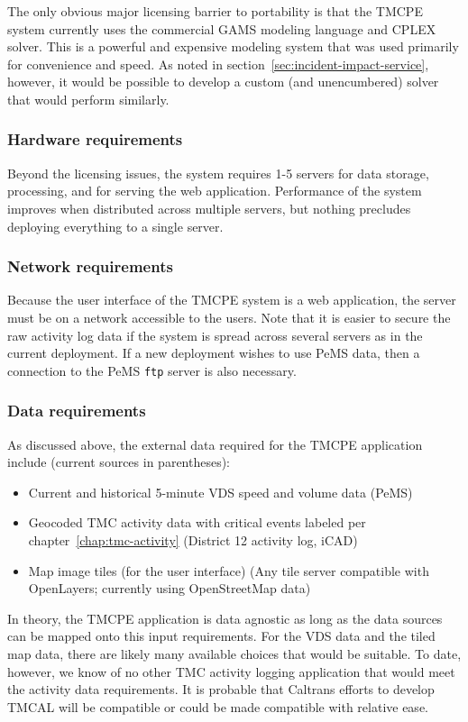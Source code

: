 \documentclass[12pt]{report}
\begin{document}
The only obvious major licensing barrier to portability is that the \ac{TMCPE}
system currently uses the commercial \ac{GAMS} modeling language and \ac{CPLEX}
solver.  This is a powerful and expensive modeling system that was used
primarily for convenience and speed.  As noted in
section~\ref{sec:incident-impact-service}, however, it would be possible to
develop a custom (and unencumbered) solver that would perform similarly.

\subsubsection{Hardware requirements}
\label{sec:portability-hardware}

Beyond the licensing issues, the system requires 1-5 servers for data storage,
processing, and for serving the web application.  Performance of the system
improves when distributed across multiple servers, but nothing precludes
deploying everything to a single server.  

\subsubsection{Network requirements}
\label{sec:portability-network}

Because the user interface of the \ac{TMCPE} system is a web application, the
server must be on a network accessible to the users.  Note that it is easier to
secure the raw activity log data if the system is spread across several servers
as in the current deployment.  If a new deployment wishes to use \ac{PeMS} data,
then a connection to the \ac{PeMS} \texttt{ftp} server is also necessary.

\subsubsection{Data requirements}
\label{sec:portability-data}

As discussed above, the external data required for the \ac{TMCPE} application
include (current sources in parentheses):
\begin{itemize}
\item Current and historical 5-minute \ac{VDS} speed and volume data (\ac{PeMS})
\item Geocoded \ac{TMC} activity data with critical events labeled per
  chapter~\ref{chap:tmc-activity} (District 12 activity log, \ac{iCAD})
\item Map image tiles (for the user interface) (Any tile server compatible with
  OpenLayers; currently using OpenStreetMap data)
\end{itemize}
In theory, the \ac{TMCPE} application is data agnostic as long as the
data sources can be mapped onto this input requirements.  For the
\ac{VDS} data and the tiled map data, there are likely many available
choices that would be suitable.  To date, however, we know of no other
\ac{TMC} activity logging application that would meet the activity
data requirements.  It is probable that Caltrans efforts to develop
\ac{TMCAL} will be compatible or could be made compatible with
relative ease.
\end{document}
